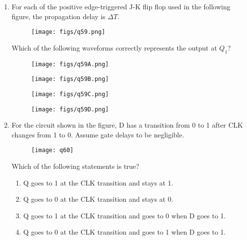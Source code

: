 \documentclass[a4paper, 11pt]{article}
\begin{document}
\begin{enumerate}
    \item For each of the positive edge-triggered J-K flip flop used in the following figure, the propagation delay is $\Delta T$.
    \begin{figure}[H]
        \centering
        \texttt{[image: figs/q59.png]}
        \caption*{}
        \label{fig:q59}
    \end{figure}
    Which of the following waveforms correctly represents the output at $Q_1$?
    \begin{figure}[H]
        \centering
        \begin{minipage}{0.45\textwidth}
            \centering
            \texttt{[image: figs/q59A.png]}
            \centerline{}
        \end{minipage}
        \hfill
        \begin{minipage}{0.45\textwidth}
            \centering
            \texttt{[image: figs/q59B.png]}
            \centerline{}
        \end{minipage}
        \vfill
        \begin{minipage}{0.45\textwidth}
            \centering
            \texttt{[image: figs/q59C.png]}
            \centerline{}
        \end{minipage}
        \hfill
        \begin{minipage}{0.45\textwidth}
            \centering
            \texttt{[image: figs/q59D.png]}
            \centerline{}
        \end{minipage}
        \caption*{}
        \label{fig:q59_options}
    \end{figure}

    \hfill{}
    
    \item For the circuit shown in the figure, D has a transition from 0 to 1 after CLK changes from 1 to 0. Assume gate delays to be negligible.
    \begin{figure}[H]
        \centering
        \texttt{[image: q60]}
        \caption*{}
        \label{fig:q60}
    \end{figure}
    Which of the following statements is true?
    \begin{enumerate}
        \item Q goes to 1 at the CLK transition and stays at 1.
        \item Q goes to 0 at the CLK transition and stays at 0.
        \item Q goes to 1 at the CLK transition and goes to 0 when D goes to 1.
        \item Q goes to 0 at the CLK transition and goes to 1 when D goes to 1.
    \end{enumerate}
    

\end{enumerate}
\end{document}
